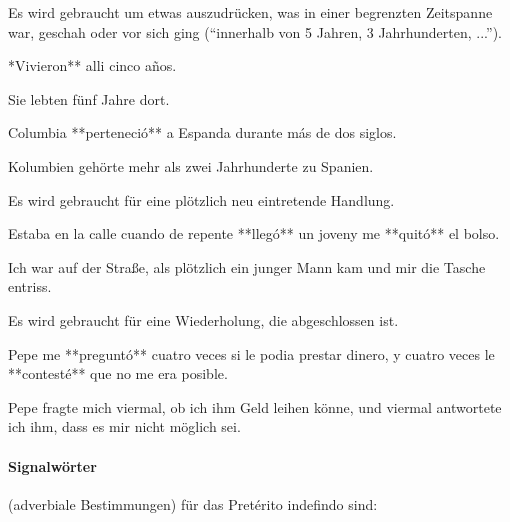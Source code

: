 Es wird gebraucht um etwas auszudrücken, was in einer begrenzten Zeitspanne
war, geschah oder vor sich ging ("`innerhalb von 5 Jahren, 3 Jahrhunderten, ..."').

\begin{compactitem}
    \item **Vivieron** alli cinco años.
    \begin{compactitem}\itshape
        \item Sie lebten fünf Jahre dort.
    \end{compactitem}
    \item Columbia **perteneció** a Espanda durante más de dos siglos.
    \begin{compactitem}\itshape
        \item Kolumbien gehörte mehr als zwei Jahrhunderte zu Spanien.
    \end{compactitem}
\end{compactitem}


Es wird gebraucht für eine plötzlich neu eintretende Handlung.

\begin{compactitem}
    \item Estaba en la calle cuando de repente **llegó** un joveny me **quitó** el bolso.
    \begin{compactitem}\itshape
        \item Ich war auf der Straße, als plötzlich ein junger Mann kam und mir die
              Tasche entriss.
    \end{compactitem}
\end{compactitem}


Es wird gebraucht für eine Wiederholung, die abgeschlossen ist.

\begin{compactitem}
    \item Pepe me **preguntó** cuatro veces si le podia prestar dinero, y cuatro veces
          le **contesté** que no me era posible.
    \begin{compactitem}\itshape
        \item Pepe fragte mich viermal, ob ich ihm Geld leihen könne, und viermal
              antwortete ich ihm, dass es mir nicht möglich sei.
    \end{compactitem}
\end{compactitem}


\paragraph{Signalwörter} (adverbiale Bestimmungen) für das Pretérito indefindo sind:

